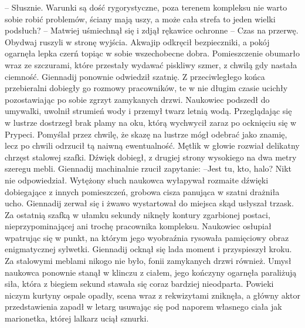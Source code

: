 \documentclass[../MAIN.tex]{subfiles}
\begin{document}
-- Słusznie. Warunki są dość rygorystyczne, poza terenem kompleksu nie warto sobie robić problemów, ściany mają uszy, a może cała strefa to jeden wielki podsłuch? -- Matwiej uśmiechnął się i zdjął rękawice ochronne -- Czas na przerwę. 
Obydwaj ruszyli w stronę wyjścia. Akwajip odkręcił bezpieczniki, a pokój ogarnęła lepka czerń topiąc w sobie wszechobecne dobra. Pomieszczenie obumarło wraz ze szczurami, które przestały wydawać piskliwy szmer, z chwilą gdy nastała ciemność. Giennadij ponownie odwiedził szatnię. Z przeciwległego końca przebieralni dobiegły go rozmowy pracowników, te w nie długim czasie ucichły pozostawiając po sobie zgrzyt zamykanych drzwi. Naukowiec podszedł do umywalki, uwolnił strumień wody i przemył twarz letnią wodą. Przeglądając się w lustrze dostrzegł brak plamy na oku, którą wychwycił zaraz po ocknięciu się w Prypeci. Pomyślał przez chwilę, że skazę na lustrze mógł odebrać jako znamię, lecz po chwili odrzucił tą naiwną ewentualność. Mętlik w głowie rozwiał delikatny chrzęst stalowej szafki. Dźwięk dobiegł, z drugiej strony wysokiego na dwa metry szeregu mebli. Giennadij machinalnie rzucił zapytanie: 
--Jest tu, kto, halo? 
Nikt nie odpowiedział. Wytężony słuch naukowca wyłapywał rozmaite dźwięki dobiegające z innych pomieszczeń, grobowa cisza panująca w szatni drażniła ucho. Giennadij zerwał się i żwawo wystartował do miejsca skąd usłyszał trzask. Za ostatnią szafką w ułamku sekundy niknęły kontury zgarbionej postaci, nieprzypominającej ani trochę pracownika kompleksu. Naukowiec osłupiał wpatrując się w punkt, na którym jego wyobraźnia rysowała pamięciowy obraz enigmatycznej sylwetki. Giennadij ocknął się lada moment i przyspieszył kroku. Za stalowymi meblami nikogo nie było, fonii zamykanych drzwi również. Umysł naukowca ponownie stanął w klinczu z ciałem, jego kończyny ogarnęła paraliżują siła, która z biegiem sekund stawała się coraz bardziej nieodparta. Powieki niczym kurtyny ospale opadły, scena wraz z rekwizytami zniknęła, a główny aktor przedstawienia zapadł w letarg usuwając się pod naporem własnego ciała jak marionetka, której lalkarz uciął sznurki. 
\end{document}
